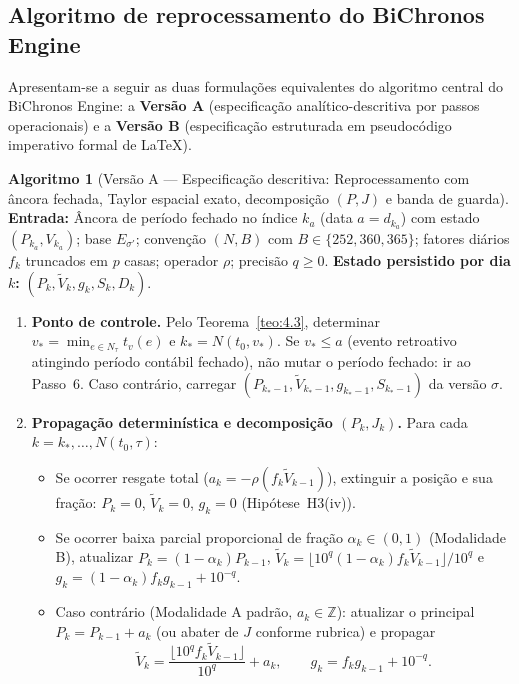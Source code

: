 \documentclass[11pt, a4paper]{article}
\theoremstyle{definition}
\newtheorem{algoritmo}[definicao]{Algoritmo}
\theoremstyle{plain}
\theoremstyle{remark}
\begin{document}
\subsection{Algoritmo de reprocessamento do BiChronos Engine}\label{sec:5.6}

Apresentam-se a seguir as duas formulações equivalentes do algoritmo central do BiChronos Engine: a \textbf{Versão A} (especificação analítico-descritiva por passos operacionais) e a \textbf{Versão B} (especificação estruturada em pseudocódigo imperativo formal de LaTeX).

\begin{algoritmo}[Versão A — Especificação descritiva: Reprocessamento com âncora fechada, Taylor espacial exato, decomposição $(P, J)$ e banda de guarda]\label{alg:5.14}
\textbf{Entrada:} Âncora de período fechado no índice $k_a$ (data $a = d_{k_a}$) com estado $(P_{k_a}, V_{k_a})$; base $E_{\sigma'}$; convenção $(N, B)$ com $B \in \{252, 360, 365\}$; fatores diários $f_k$ truncados em $p$ casas; operador $\rho$; precisão $q \ge 0$. \textbf{Estado persistido por dia $k$:} $(P_k, \tilde{V}_k, g_k, S_k, D_k)$.
\begin{enumerate}[label=\textbf{\arabic*.}]
    \item \textbf{Ponto de controle.} Pelo Teorema~\ref{teo:4.3}, determinar $v_* = \min_{e \in N_\tau} t_v(e)$ e $k_* = N(t_0, v_*)$. Se $v_* \le a$ (evento retroativo atingindo período contábil fechado), não mutar o período fechado: ir ao Passo~6. Caso contrário, carregar $(P_{k_* - 1}, \tilde{V}_{k_* - 1}, g_{k_* - 1}, S_{k_* - 1})$ da versão $\sigma$.
    \item \textbf{Propagação determinística e decomposição $(P_k, J_k)$.} Para cada $k = k_*, \dots, N(t_0, \tau)$:
    \begin{itemize}
        \item Se ocorrer resgate total ($a_k = -\rho(f_k \tilde{V}_{k-1})$), extinguir a posição e sua fração: $P_k = 0$, $\tilde{V}_k = 0$, $g_k = 0$ (Hipótese~H3(iv)).
        \item Se ocorrer baixa parcial proporcional de fração $\alpha_k \in (0, 1)$ (Modalidade B), atualizar $P_k = (1 - \alpha_k)P_{k-1}$, $\tilde{V}_k = \lfloor 10^q (1 - \alpha_k) f_k \tilde{V}_{k-1} \rfloor / 10^q$ e $g_k = (1 - \alpha_k)f_k g_{k-1} + 10^{-q}$.
        \item Caso contrário (Modalidade A padrão, $a_k \in \mathbb{Z}$): atualizar o principal $P_k = P_{k-1} + a_k$ (ou abater de $J$ conforme rubrica) e propagar
        \[
        \tilde{V}_k = \frac{\lfloor 10^q f_k \tilde{V}_{k-1} \rfloor}{10^q} + a_k, \qquad g_k = f_k g_{k-1} + 10^{-q}.
\]
\end{itemize}
\end{enumerate}
\end{algoritmo}
\end{document}
